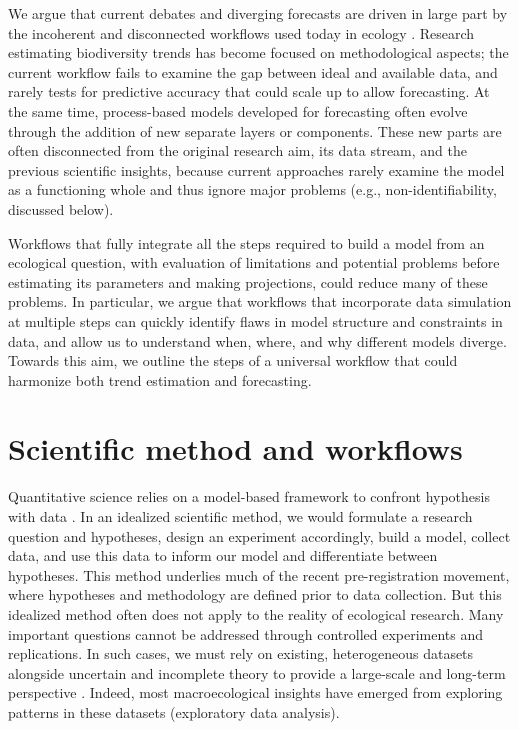 \documentclass[11pt]{article}
\begin{document}
We argue that current debates and diverging forecasts are driven in large part by the incoherent and disconnected workflows used today in ecology \citep{Loreau2022, Talis2023, Johnson2024}. Research estimating biodiversity trends has become focused on methodological aspects; the current workflow fails to examine the gap between ideal and available data, and rarely tests for predictive accuracy that could scale up to allow forecasting. At the same time, process-based models developed for forecasting often evolve through the addition of new separate layers or components. These new parts are often disconnected from the original research aim, its data stream, and the previous scientific insights, because current approaches rarely examine the model as a functioning whole and thus ignore major problems (e.g., non-identifiability, discussed below).

Workflows that fully integrate all the steps required to build a model from an ecological question, with evaluation of limitations and potential problems before estimating its parameters and making projections, could reduce many of these problems. In particular, we argue that workflows that incorporate data simulation at multiple steps can quickly identify flaws in model structure and constraints in data, and allow us to understand when, where, and why different models diverge. Towards this aim, we outline the steps of a universal workflow that could harmonize both trend estimation and forecasting.

\section{Scientific method and workflows}

Quantitative science relies on a model-based framework to confront hypothesis with data \citep{Chamberlin:1965cd}. In an idealized scientific method, we would formulate a research question and hypotheses, design an experiment accordingly, build a model, collect data, and use this data to inform our model and differentiate between hypotheses. This method underlies much of the recent pre-registration movement, where hypotheses and methodology are defined prior to data collection. %
But this idealized method often does not apply to the reality of ecological research. Many important questions cannot be addressed through controlled experiments and replications. In such cases, we must rely on existing, heterogeneous datasets alongside uncertain and incomplete theory to provide a large-scale and long-term perspective \citep{Hilborn1997}. Indeed, most macroecological insights have emerged from exploring patterns in these datasets (exploratory data analysis).
\end{document}
